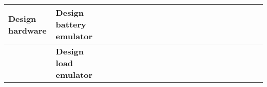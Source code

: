 \begin{table}[ht]
\begin{tabular}{ll|llllllllllllllllllll|}
    \multicolumn{1}{|l|}{\cellcolor[HTML]{38FFF8}\textbf{Design hardware}} & \cellcolor[HTML]{38FFF8}\textbf{Design battery emulator}                                                             & \multicolumn{1}{l|}{}                                   & \multicolumn{1}{l|}{}                                   & \multicolumn{1}{l|}{}                                   & \multicolumn{1}{l|}{}                                   & \multicolumn{1}{l|}{}                                   & \multicolumn{1}{l|}{}                                   & \multicolumn{1}{l|}{\cellcolor[HTML]{F8A102}}           & \multicolumn{1}{l|}{\cellcolor[HTML]{F8A102}}           & \multicolumn{1}{l|}{\cellcolor[HTML]{F8A102}}           & \multicolumn{1}{l|}{\cellcolor[HTML]{F8A102}}            & \multicolumn{1}{l|}{\cellcolor[HTML]{F8A102}}            & \multicolumn{1}{l|}{\cellcolor[HTML]{F8A102}}            & \multicolumn{1}{l|}{}                                    & \multicolumn{1}{l|}{}                                    & \multicolumn{1}{l|}{}                                    & \multicolumn{1}{l|}{}                                    & \multicolumn{1}{l|}{}                                    & \multicolumn{1}{l|}{}                                    & \multicolumn{1}{l|}{}                                    &             \\ \hline
    \multicolumn{1}{|l|}{\cellcolor[HTML]{38FFF8}\textbf{}}                & \cellcolor[HTML]{38FFF8}\textbf{Design load emulator}                                                                & \multicolumn{1}{l|}{}                                   & \multicolumn{1}{l|}{}                                   & \multicolumn{1}{l|}{}                                   & \multicolumn{1}{l|}{}                                   & \multicolumn{1}{l|}{}                                   & \multicolumn{1}{l|}{}                                   & \multicolumn{1}{l|}{\cellcolor[HTML]{F8A102}}           & \multicolumn{1}{l|}{\cellcolor[HTML]{F8A102}}           & \multicolumn{1}{l|}{\cellcolor[HTML]{F8A102}}           & \multicolumn{1}{l|}{\cellcolor[HTML]{F8A102}}            & \multicolumn{1}{l|}{\cellcolor[HTML]{F8A102}}            & \multicolumn{1}{l|}{\cellcolor[HTML]{F8A102}}            & \multicolumn{1}{l|}{}                                    & \multicolumn{1}{l|}{}                                    & \multicolumn{1}{l|}{}                                    & \multicolumn{1}{l|}{}                                    & \multicolumn{1}{l|}{}                                    & \multicolumn{1}{l|}{}                                    & \multicolumn{1}{l|}{}                                    &             \\ \hline

\end{tabular}
\end{table}
